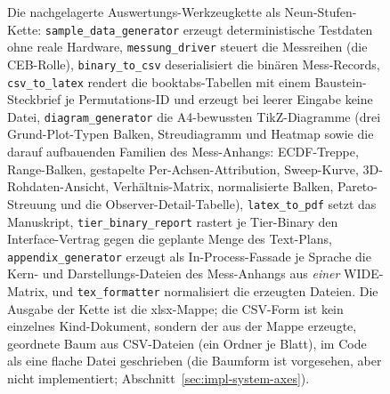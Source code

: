 \begin{nurlang}
\begin{figure}[htbp]
\caption[Die nachgelagerte Auswertungs-Werkzeugkette]{Die nachgelagerte Auswertungs-Werkzeugkette als
Neun-Stufen-Kette: \texttt{sample\_data\_generator} erzeugt deterministische Testdaten ohne reale
Hardware, \texttt{messung\_driver} steuert die Messreihen (die CEB-Rolle), \texttt{binary\_to\_csv}
deserialisiert die binären Mess-Records, \texttt{csv\_to\_latex} rendert die booktabs-Tabellen mit einem
Baustein-Steckbrief je Permutations-ID und erzeugt bei leerer Eingabe keine Datei, \texttt{diagram\_generator}
die A4-bewussten TikZ-Diagramme (drei Grund-Plot-Typen Balken, Streudiagramm und Heatmap sowie die darauf
aufbauenden Familien des Mess-Anhangs: ECDF-Treppe, Range-Balken, gestapelte Per-Achsen-Attribution,
Sweep-Kurve, 3D-Rohdaten-Ansicht, Verhältnis-Matrix, normalisierte Balken, Pareto-Streuung und die
Observer-Detail-Tabelle), \texttt{latex\_to\_pdf}
setzt das Manuskript, \texttt{tier\_binary\_report} rastert je Tier-Binary den Interface-Vertrag gegen die
geplante Menge des Text-Plans, \texttt{appendix\_generator} erzeugt als In-Process-Fassade je Sprache die
Kern- und Darstellungs-Dateien des Mess-Anhangs aus \emph{einer} WIDE-Matrix, und \texttt{tex\_formatter}
normalisiert die erzeugten Dateien. Die Ausgabe der Kette ist die xlsx-Mappe; die CSV-Form ist kein
einzelnes Kind-Dokument, sondern der aus der Mappe erzeugte, geordnete Baum aus CSV-Dateien (ein Ordner je
Blatt), im Code als eine flache Datei geschrieben (die Baumform ist vorgesehen, aber nicht implementiert;
Abschnitt~\ref{sec:impl-system-axes}).}\label{fig:toolchain}
\end{figure}


\end{nurlang}
